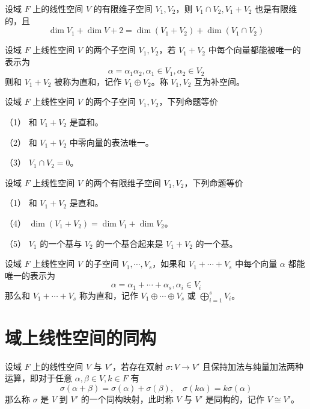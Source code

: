 \begin{theorem}
    设域 $F$ 上的线性空间 $V$ 的有限维子空间 $V_1,V_2$，则 $V_1 \cap V_2, V_1+V_2$ 也是有限维的，且
    \[ \dim V_1 + \dim V+2 = \dim(V_1+V_2) + \dim(V_1 \cap V_2) \]
\end{theorem}

\begin{definition}[直和]
    设域 $F$ 上线性空间 $V$ 的两个子空间 $V_1,V_2$，若 $V_1+V_2$ 中每个向量都能被唯一的表示为
    \[ \alpha = \alpha_1 \alpha_2, \alpha_1 \in V_1, \alpha_2 \in V_2 \]
    则和 $V_1+V_2$ 被称为直和，记作 $V_1 \oplus V_2$。称 $V_1,V_2$ 互为补空间。 
\end{definition}

\begin{theorem}
    设域 $F$ 上线性空间 $V$ 的两个子空间 $V_1,V_2$，下列命题等价
    
    （1） 和 $V_1+V_2$ 是直和。
    
    （2） 和 $V_1+V_2$ 中零向量的表法唯一。
    
    （3） $V_1 \cap V_2 = 0$。
\end{theorem}

\begin{theorem}
    设域 $F$ 上线性空间 $V$ 的两个有限维子空间 $V_1,V_2$，下列命题等价
    
    （1） 和 $V_1+V_2$ 是直和。
    
    （4） $\dim(V_1+V_2) = \dim V_1 + \dim V_2$。
    
    （5） $V_1$ 的一个基与 $V_2$ 的一个基合起来是 $V_1+V_2$ 的一个基。
\end{theorem}

\begin{definition}
    设域 $F$ 上线性空间 $V$ 的子空间 $V_1,\cdots,V_s$，如果和 $V_1+\cdots+V_s$ 中每个向量 $\alpha$ 都能唯一的表示为
    \[ \alpha = \alpha_1 + \cdots + \alpha_s, \alpha_i \in V_i \]
    那么和 $V_1 + \cdots + V_s$ 称为直和，记作 $V_1 \oplus \cdots \oplus V_s$ 或 $\displaystyle\bigoplus_{i=1}^s V_i$。
\end{definition}

\section{域上线性空间的同构}

\begin{definition}[同构]
    设域 $F$ 上的线性空间 $V$ 与 $V'$，若存在双射 $\sigma : V \to V'$ 且保持加法与纯量加法两种运算，即对于任意 $\alpha,\beta \in V,k\in F$ 有
    \[ \sigma(\alpha+\beta) = \sigma(\alpha) + \sigma(\beta), \quad \sigma(k\alpha) = k\sigma(\alpha) \]
    那么称 $\sigma$ 是 $V$ 到 $V'$ 的一个同构映射，此时称 $V$ 与 $V'$ 是同构的，记作 $V \cong V'$。
\end{definition}

